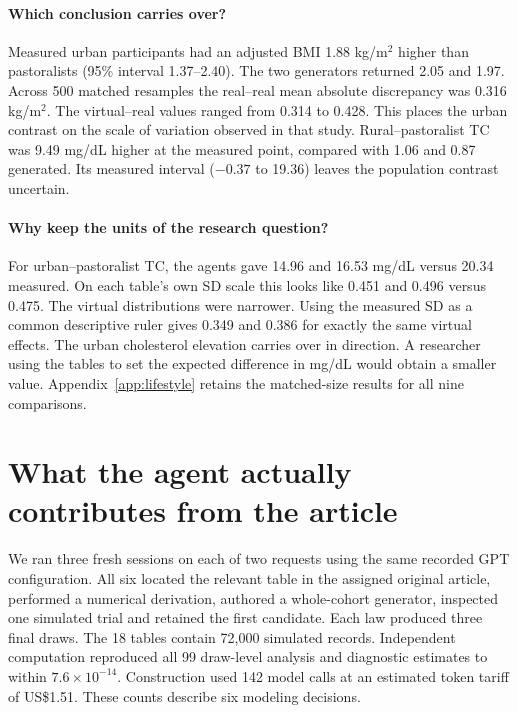 \documentclass[sigconf,anonymous,review]{acmart}
\begin{document}
\paragraph{Which conclusion carries over?}
Measured urban participants had an adjusted BMI 1.88 kg/m$^2$ higher than pastoralists (95\% interval 1.37--2.40). The two generators returned 2.05 and 1.97. Across 500 matched resamples the real--real mean absolute discrepancy was 0.316 kg/m$^2$. The virtual--real values ranged from 0.314 to 0.428. This places the urban contrast on the scale of variation observed in that study. Rural--pastoralist TC was 9.49 mg/dL higher at the measured point, compared with 1.06 and 0.87 generated. Its measured interval ($-0.37$ to 19.36) leaves the population contrast uncertain.

\paragraph{Why keep the units of the research question?}
For urban--pastoralist TC, the agents gave 14.96 and 16.53 mg/dL versus 20.34 measured. On each table's own SD scale this looks like 0.451 and 0.496 versus 0.475. The virtual distributions were narrower. Using the measured SD as a common descriptive ruler gives 0.349 and 0.386 for exactly the same virtual effects. The urban cholesterol elevation carries over in direction. A researcher using the tables to set the expected difference in mg/dL would obtain a smaller value. Appendix~\ref{app:lifestyle} retains the matched-size results for all nine comparisons.

\section{What the agent actually contributes from the article}
\label{sec:original}

We ran three fresh sessions on each of two requests using the same recorded GPT configuration. All six located the relevant table in the assigned original article, performed a numerical derivation, authored a whole-cohort generator, inspected one simulated trial and retained the first candidate. Each law produced three final draws. The 18 tables contain 72,000 simulated records. Independent computation reproduced all 99 draw-level analysis and diagnostic estimates to within $7.6\times10^{-14}$. Construction used 142 model calls at an estimated token tariff of US\$1.51. These counts describe six modeling decisions.
\end{document}
